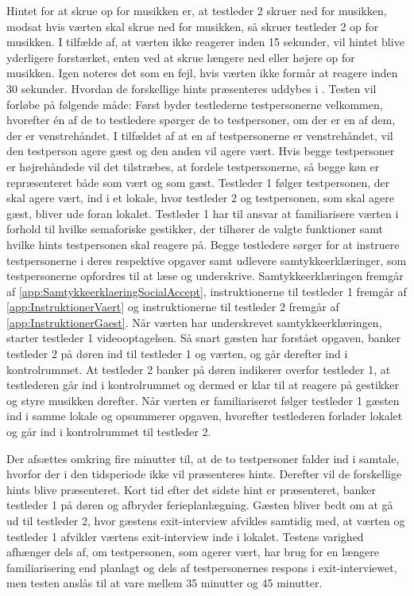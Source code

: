Hintet for at skrue op for musikken er, at testleder 2 skruer ned for musikken, modsat hvis værten skal skrue ned for musikken, så skruer testleder 2 op for musikken. I tilfælde af, at værten ikke reagerer inden 15 sekunder, vil hintet blive yderligere forstærket, enten ved at skrue længere ned eller højere op for musikken. Igen noteres det som en fejl, hvis værten ikke formår at reagere inden 30 sekunder. Hvordan de forskellige hints præsenteres uddybes i .\blankline
% 
Testen vil forløbe på følgende måde: Først byder testlederne testpersonerne velkommen, hvorefter én af de to testledere spørger de to testpersoner, om der er en af dem, der er venstrehåndet. I tilfældet af at en af testpersonerne er venstrehåndet, vil den testperson agere gæst og den anden vil agere vært. Hvis begge testpersoner er højrehåndede vil det tilstræbes, at fordele testpersonerne, så begge køn er repræsenteret både som vært og som gæst. Testleder 1 følger testpersonen, der skal agere vært, ind i et lokale, hvor testleder 2 og testpersonen, som skal agere gæst, bliver ude foran lokalet. Testleder 1 har til ansvar at familiarisere værten i forhold til hvilke semaforiske gestikker, der tilhører de valgte funktioner samt hvilke hints testpersonen skal reagere på. Begge testledere sørger for at instruere testpersonerne i deres respektive opgaver samt udlevere samtykkeerklæringer, som testpersonerne opfordres til at læse og underskrive. Samtykkeerklæringen fremgår af \autoref{app:SamtykkeerklaeringSocialAccept}, instruktionerne til testleder 1 fremgår af \autoref{app:InstruktionerVaert} og instruktionerne til testleder 2 fremgår af \autoref{app:InstruktionerGaest}. Når værten har underskrevet samtykkeerklæringen, starter testleder 1 videooptagelsen. Så snart gæsten har forstået opgaven, banker testleder 2 på døren ind til testleder 1 og værten, og går derefter ind i kontrolrummet. At testleder 2 banker på døren indikerer overfor testleder 1, at testlederen går ind i kontrolrummet og dermed er klar til at reagere på gestikker og styre musikken derefter. Når værten er familiariseret følger testleder 1 gæsten ind i samme lokale og opsummerer opgaven, hvorefter testlederen forlader lokalet og går ind i kontrolrummet til testleder 2.
 
Der afsættes omkring fire minutter til, at de to testpersoner falder ind i samtale, hvorfor der i den tidsperiode ikke vil præsenteres hints. Derefter vil de forskellige hints blive præsenteret. Kort tid efter det sidste hint er præsenteret, banker testleder 1 på døren og afbryder ferieplanlægning. Gæsten bliver bedt om at gå ud til testleder 2, hvor gæstens exit-interview afvikles samtidig med, at værten og testleder 1 afvikler værtens exit-interview inde i lokalet.\blankline
%
Testens varighed afhænger dels af, om testpersonen, som agerer vært, har brug for en længere familiarisering end planlagt og dels af testpersonernes respons i exit-interviewet, men testen anslås til at vare mellem 35 minutter og 45 minutter. 
%
